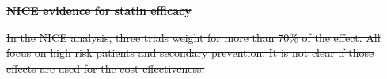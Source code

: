 \documentclass[10pt,letterpaper]{article}
\providecommand{\DIFdeltex}[1]{{\protect\color{red}\sout{#1}}}                      %
\providecommand{\DIFdelbegin}{} %
\providecommand{\DIFdelend}{} %
\providecommand{\DIFdel}[1]{\texorpdfstring{\DIFdeltex{#1}}{}} %
\newcommand{\DIFscaledelfig}{0.5}
\newlength{\DIFdelgraphicswidth} %
\newlength{\DIFdelgraphicsheight} %
\newcommand{\DIFdelincludegraphics}[2][]{%
\sbox{\DIFdelgraphicsbox}{\DIFOincludegraphics[#1]{#2}}%
\settoboxwidth{\DIFdelgraphicswidth}{\DIFdelgraphicsbox} %
\settoboxtotalheight{\DIFdelgraphicsheight}{\DIFdelgraphicsbox} %
\scalebox{\DIFscaledelfig}{%
\parbox[b]{\DIFdelgraphicswidth}{\usebox{\DIFdelgraphicsbox}\\[-\baselineskip] \rule{\DIFdelgraphicswidth}{0em}}\llap{\resizebox{\DIFdelgraphicswidth}{\DIFdelgraphicsheight}{%
\setlength{\unitlength}{\DIFdelgraphicswidth}%
\begin{picture}(1,1)%
\thicklines\linethickness{2pt} %
{\color[rgb]{1,0,0}\put(0,0){\framebox(1,1){}}}%
{\color[rgb]{1,0,0}\put(0,0){\line( 1,1){1}}}%
{\color[rgb]{1,0,0}\put(0,1){\line(1,-1){1}}}%
\end{picture}%
}\hspace*{3pt}}} %
} %
\DeclareRobustCommand{\DIFdelbegin}{\DIFOdelbegin \let\includegraphics\DIFdelincludegraphics} %
\DeclareRobustCommand{\DIFdelend}{\DIFOaddend \let\includegraphics\DIFOincludegraphics} %
\begin{document}
\DIFdelbegin \textbf{\DIFdel{NICE evidence for statin efficacy}}
\DIFdelend %

\DIFdelbegin \DIFdel{In the NICE analysis, three trials weight for more than 70\% of the effect. All
focus on high risk patients and secondary prevention. It is not clear if
those effects are used for the cost-effectiveness.
}\DIFdelend %
\end{document}
